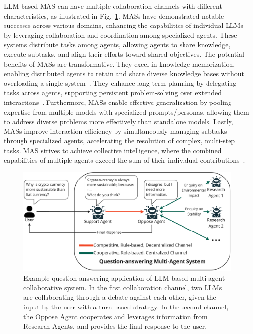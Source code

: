 \documentclass[acmsmall,nonacm]{acmart}
\begin{document}
        LLM-based MAS can have multiple collaboration channels with different characteristics, as illustrated in Fig.~\ref{fig:example}.
        MASs have demonstrated notable successes across various domains, enhancing the capabilities of individual LLMs by leveraging collaboration and coordination among specialized agents. These systems distribute tasks among agents, allowing agents to share knowledge, execute subtasks, and align their efforts toward shared objectives. The potential benefits of MASs are transformative. They excel in knowledge memorization, enabling distributed agents to retain and share diverse knowledge bases without overloading a single system~\cite{hatalis2023memory,zhang2024survey}. They enhance long-term planning by delegating tasks across agents, supporting persistent problem-solving over extended interactions~\cite{huang2024understanding}. Furthermore, MASs enable effective generalization by pooling expertise from multiple models with specialized prompts/personas, allowing them to address diverse problems more effectively than standalone models. Lastly, MASs improve interaction efficiency by simultaneously managing subtasks through specialized agents, accelerating the resolution of complex, multi-step tasks. MAS strives to achieve collective intelligence, where the combined capabilities of multiple agents exceed the sum of their individual contributions~\cite{chen2024agentverse}.

        \begin{figure}
            \centering
            \includegraphics[width=0.9\linewidth]{image-lib/example_v2.pdf}
            \caption{Example question-answering application of LLM-based multi-agent collaborative system. In the first collaboration channel, two LLMs are collaborating through a debate against each other, given the input by the user with a turn-based strategy. In the second channel, the Oppose Agent cooperates and leverages information from Research Agents, and provides the final response to the user.}\label{fig:example}
        \end{figure}
\end{document}
